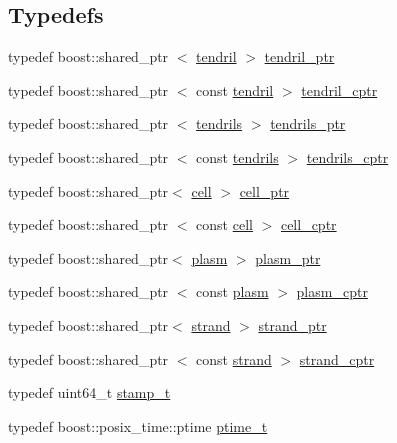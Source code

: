 \subsection*{\-Typedefs}
\begin{DoxyCompactItemize}
\item 
typedef boost\-::shared\-\_\-ptr\*
$<$ \hyperlink{classecto_1_1tendril}{tendril} $>$ \hyperlink{namespaceecto_a84fb5f6130275382e5cbeb5fdececa78}{tendril\-\_\-ptr}
\item 
typedef boost\-::shared\-\_\-ptr\*
$<$ const \hyperlink{classecto_1_1tendril}{tendril} $>$ \hyperlink{namespaceecto_ad01f26ee47597f71a6f86ee34bb3ffe4}{tendril\-\_\-cptr}
\item 
typedef boost\-::shared\-\_\-ptr\*
$<$ \hyperlink{classecto_1_1tendrils}{tendrils} $>$ \hyperlink{namespaceecto_a89953a225525948cb71d5488c3c6472b}{tendrils\-\_\-ptr}
\item 
typedef boost\-::shared\-\_\-ptr\*
$<$ const \hyperlink{classecto_1_1tendrils}{tendrils} $>$ \hyperlink{namespaceecto_a6165b23b34082cfc17104ca7e9f1b212}{tendrils\-\_\-cptr}
\item 
typedef boost\-::shared\-\_\-ptr$<$ \hyperlink{structecto_1_1cell}{cell} $>$ \hyperlink{namespaceecto_aed1809e82b9229ea81ef9ee3438cf62c}{cell\-\_\-ptr}
\item 
typedef boost\-::shared\-\_\-ptr\*
$<$ const \hyperlink{structecto_1_1cell}{cell} $>$ \hyperlink{namespaceecto_ab708c826226c91fd6f3c8c121f293a78}{cell\-\_\-cptr}
\item 
typedef boost\-::shared\-\_\-ptr$<$ \hyperlink{structecto_1_1plasm}{plasm} $>$ \hyperlink{namespaceecto_a6b83be6cd685db71f03b14871653475f}{plasm\-\_\-ptr}
\item 
typedef boost\-::shared\-\_\-ptr\*
$<$ const \hyperlink{structecto_1_1plasm}{plasm} $>$ \hyperlink{namespaceecto_a5a9973f00c94e30353acb27c3d2fa836}{plasm\-\_\-cptr}
\item 
typedef boost\-::shared\-\_\-ptr$<$ \hyperlink{structecto_1_1strand}{strand} $>$ \hyperlink{namespaceecto_a98ca3b7b690de778292922c806e7588d}{strand\-\_\-ptr}
\item 
typedef boost\-::shared\-\_\-ptr\*
$<$ const \hyperlink{structecto_1_1strand}{strand} $>$ \hyperlink{namespaceecto_abbad20d834739bbf762269e4e04a6732}{strand\-\_\-cptr}
\item 
typedef uint64\-\_\-t \hyperlink{namespaceecto_a96ba8fa498cc4b8e2a0217a9e236b50d}{stamp\-\_\-t}
\item 
typedef boost\-::posix\-\_\-time\-::ptime \hyperlink{namespaceecto_a5bbe8fb0da047cb18d92eb9dfb469652}{ptime\-\_\-t}

\end{DoxyCompactItemize}
